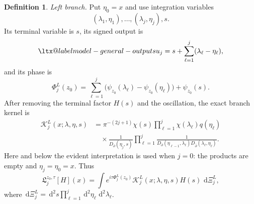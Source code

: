 \documentclass[a4paper,11pt]{article}
\makeatletter
\newcommand{\dd}{\,\text{d}}
\newcommand{\aliaslabel}[1]{\ltx@label{#1}}
\theoremstyle{plain}
\theoremstyle{definition}
\newtheorem{dfn}[thm]{Definition}
\theoremstyle{remark}
\makeatother
\begin{document}
\begin{dfn}
\par\smallskip\noindent\textit{Left branch.}
Put $\eta_0=x$ and use integration variables
\[
 (\lambda_1,\eta_1),\ldots,(\lambda_j,\eta_j),s .
\]
Its terminal variable is $s$, its signed output is
\begin{equation}\label{exact-left-output}\aliaslabel{model-general-outputs}
        u_j=s+\sum_{\ell=1}^j(\lambda_\ell-\eta_\ell),
\end{equation}
and its phase is
\begin{equation}\label{exact-left-phase}
        \Phi_j^L(z_0)
        =\sum_{\ell=1}^j
          \bigl(\psi_{z_0}(\lambda_\ell)-\psi_{z_0}(\eta_\ell)\bigr)
          +\psi_{z_0}(s).
\end{equation}
After removing the terminal factor $H(s)$ and the oscillation, the exact branch
kernel is
\begin{equation}\label{exact-left-kernel}
\begin{aligned}
\mathcal K_j^L(x;\lambda,\eta,s)
&=\pi^{-(2j+1)}\chi(s)
  \prod_{\ell=1}^j\chi(\lambda_\ell)q(\eta_\ell)\\
&\quad\times
  \frac{1}{D_\partial(\eta_j,s)}
  \prod_{\ell=1}^j
  \frac{1}{D_\partial(\eta_{\ell-1},\lambda_\ell)
          D_{\bar\partial}(\lambda_\ell,\eta_\ell)} .
\end{aligned}
\end{equation}
Here and below the evident interpretation is used when $j=0$: the products are
empty and $\eta_j=\eta_0=x$.  Thus
\begin{equation}\label{exact-left-expanded}
\mathfrak L_j^{z_0,\tau}[H](x)
 =\int e^{i\tau\Phi_j^L(z_0)}
       \mathcal K_j^L(x;\lambda,\eta,s)H(s)\,\dd\Xi_j^L,
\end{equation}
where $\dd\Xi_j^L=\dd^2s\prod_{\ell=1}^j\dd^2\eta_\ell\,\dd^2\lambda_\ell$.


\end{dfn}
\end{document}
